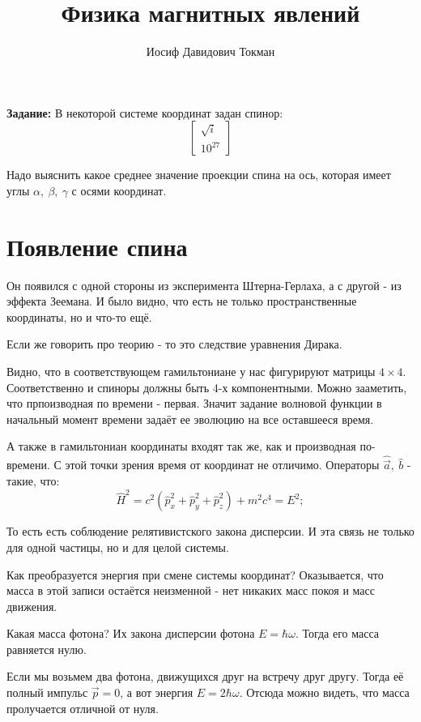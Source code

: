 \documentclass[a4paper, 14pt, russian]{article}
\title{Физика магнитных явлений}
\author{Иосиф Давидович Токман}
\date{}
\newcommand{\be}{\begin{equation}}
\newcommand{\ee}{\end{equation}}
\begin{document}
	\maketitle

	\begin{tcolorbox}
		\textbf{Задание:} В некоторой системе координат задан спинор:
		\be
			\begin{bmatrix}
				\sqrt{i}\\
				10^{27}
			\end{bmatrix}
		\ee

		Надо выяснить какое среднее значение проекции спина на ось, которая 
		имеет углы $\alpha,~\beta,~\gamma$ с осями координат.
	\end{tcolorbox}

	\section{Появление спина}

	Он появился с одной стороны из эксперимента Штерна-Герлаха, а с другой  - из 
	эффекта Зеемана. И было видно, что есть не только пространственные координаты, 
	но и что-то ещё.

	Если же говорить про теорию - то это следствие уравнения Дирака.

	Видно, что в соответствующем гамильтониане у нас фигурируют матрицы $4 \times 4$.
	Соответственно и спиноры должны быть 4-х компонентными. Можно зааметить, что
	прпоизводная по времени - первая. Значит задание волновой функции в начальный 
	момент времени задаёт ее эволюцию на все оставшееся время.

	А также в гамильтониан координаты входят так же, как и производная по-времени.
	С этой точки зрения время от координат  не отличимо. Операторы 
	$\hat{\vec a},~\hat{b}$ - такие, что:
	\be
		\hat{H}^2 = c^2 (\hat{p}_x^2 + \hat{p}_y^2 + \hat{p}_z^2) + m^2 c^4 = E^2;
	\ee

	То есть есть соблюдение релятивистского закона дисперсии. И эта связь не 
	только для одной частицы, но и для целой системы.

	Как преобразуется энергия при смене системы координат? Оказывается, что
	масса в этой записи остаётся неизменной - нет никаких масс покоя и масс движения.

	Какая масса фотона? Их закона дисперсии фотона $E = \hbar \omega$.
	Тогда его масса равняется нулю. 
	
	Если мы возьмем два фотона, движущихся друг на встречу друг другу.
	Тогда её полный импульс $\vec p = 0$, а вот энергия $E = 2 \hbar \omega$.
	Отсюда можно видеть, что масса пролучается отличной от нуля.
\end{document}
